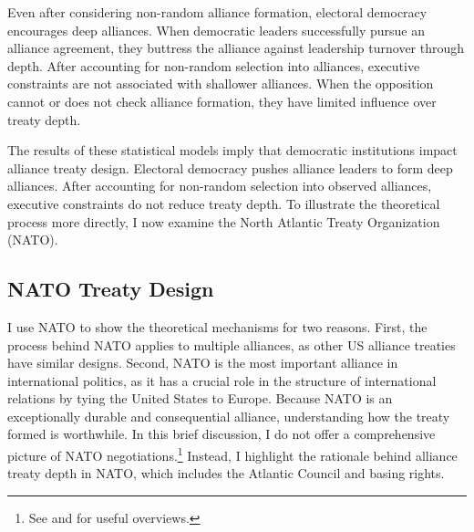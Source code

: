 \documentclass[12pt]{article}
\begin{document}
Even after considering non-random alliance formation, electoral democracy encourages deep alliances. 
When democratic leaders successfully pursue an alliance agreement, they buttress the alliance against leadership turnover through depth. 
After accounting for non-random selection into alliances, executive constraints are not associated with shallower alliances.
When the opposition cannot or does not check alliance formation, they have limited influence over treaty depth. 


The results of these statistical models imply that democratic institutions impact alliance treaty design. 
Electoral democracy pushes alliance leaders to form deep alliances. 
After accounting for non-random selection into observed alliances, executive constraints do not reduce treaty depth. 
To illustrate the theoretical process more directly, I now examine the North Atlantic Treaty Organization (NATO).



\subsection{NATO Treaty Design}


I use NATO to show the theoretical mechanisms for two reasons. 
First, the process behind NATO applies to multiple alliances, as other US alliance treaties have similar designs. 
Second, NATO is the most important alliance in international politics, as it has a crucial role in the structure of international relations by tying the United States to Europe. 
Because NATO is an exceptionally durable and consequential alliance, understanding how the treaty formed is worthwhile. 
In this brief discussion, I do not offer a comprehensive picture of NATO negotiations.\footnote{See \citet{Kaplan2007} and \citet{Poast2019a} for useful overviews.} 
Instead, I highlight the rationale behind alliance treaty depth in NATO, which includes the Atlantic Council and basing rights. 
\end{document}
